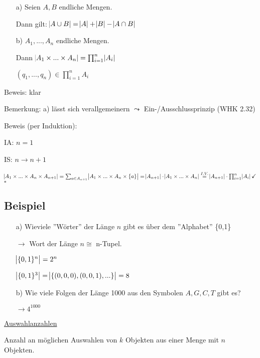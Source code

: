 \documentclass[a4paper, 12pt, twoside] {article}
\begin{document}
\begin{itemize}
\item[a)] Seien $A,B$ endliche Mengen.

Dann gilt: $\abs{A \cup B} = \abs{A} + \abs{B} - \abs{A \cap B}$

\item[b)] $A_1, ..., A_n$ endliche Mengen.

Dann $\abs{A_1 \times ... \times A_n} = \prod_{i=1}^n \abs{A_i}$

$(q_1, ..., q_n) \in \prod_{i=1}^n A_i$

\end{itemize}

Beweis: klar


Bemerkung: a) lässt sich verallgemeinern $\leadsto$ Ein-/Ausschlussprinzip (WHK 2.32)

Beweis (per Induktion):

IA: $n=1$ \checkmark

IS: $n \to n+1$

$\abs{A_1 \times ... \times A_n \times A_{n+1}} = \sum_{a \in A_{n+1}} \abs{A_1 \times ... \times A_n \times \{a\}} = \abs{A_{n+1}} \cdot \abs{A_1 \times ... \times A_n} \overset{I.V.}{=} \abs{A_{n+1}} \cdot \prod_{i=1}^n \abs{A_i} \checkmark$ \hfill $\square$

\subsection{Beispiel} %

\begin{itemize}
\item[a)] Wieviele ''Wörter'' der Länge $n$ gibt es über dem ''Alphabet'' \{0,1\}

$\to$ Wort der Länge $n \cong $ n-Tupel.

$\abs{\{0,1\}^n} = 2^n$

$\abs{\{0,1\}^3} = \abs{\{(0,0,0),(0,0,1),...\}} = 8$

\item[b)] Wie viele Folgen der Länge 1000 aus den Symbolen $A,G,C,T$ gibt es?

$\to 4^1000$

\end{itemize}

\uline{Auswahlanzahlen}

Anzahl an möglichen Auswahlen von $k$ Objekten aus einer Menge mit $n$ Objekten.
\end{document}
